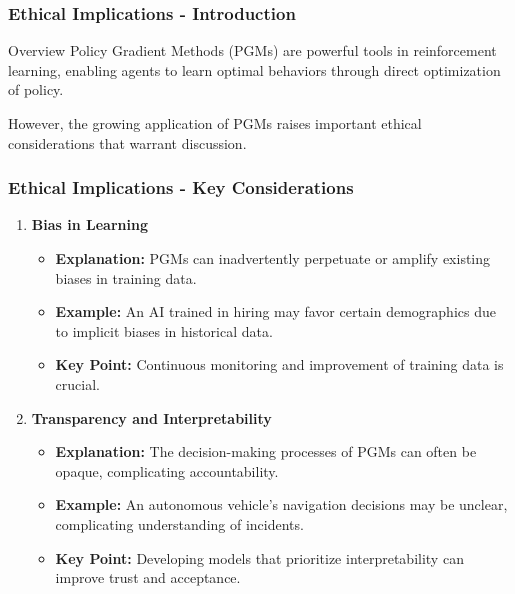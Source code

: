 \documentclass[aspectratio=169]{beamer}
\begin{document}
\begin{frame}[fragile]
    \frametitle{Ethical Implications - Introduction}
    \begin{block}{Overview}
        Policy Gradient Methods (PGMs) are powerful tools in reinforcement learning, enabling agents to learn optimal behaviors through direct optimization of policy.
    \end{block}
    However, the growing application of PGMs raises important ethical considerations that warrant discussion.
\end{frame}

\begin{frame}[fragile]
    \frametitle{Ethical Implications - Key Considerations}
    \begin{enumerate}
        \item \textbf{Bias in Learning}
            \begin{itemize}
                \item \textbf{Explanation:} PGMs can inadvertently perpetuate or amplify existing biases in training data.
                \item \textbf{Example:} An AI trained in hiring may favor certain demographics due to implicit biases in historical data.
                \item \textbf{Key Point:} Continuous monitoring and improvement of training data is crucial.
            \end{itemize}

        \item \textbf{Transparency and Interpretability}
            \begin{itemize}
                \item \textbf{Explanation:} The decision-making processes of PGMs can often be opaque, complicating accountability.
                \item \textbf{Example:} An autonomous vehicle's navigation decisions may be unclear, complicating understanding of incidents.
                \item \textbf{Key Point:} Developing models that prioritize interpretability can improve trust and acceptance.
            \end{itemize}
    \end{enumerate}
\end{frame}
\end{document}
